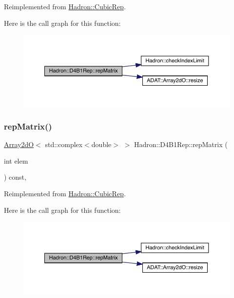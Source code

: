 Reimplemented from \mbox{\hyperlink{structHadron_1_1CubicRep_ac5d7e9e6f4ab1158b5fce3e4ad9e8005}{Hadron\+::\+Cubic\+Rep}}.

Here is the call graph for this function\+:
\nopagebreak
\begin{figure}[H]
\begin{center}
\leavevmode
\includegraphics[width=350pt]{d6/d99/structHadron_1_1D4B1Rep_aaee6044952bae4a4d852115d4e1add07_cgraph}
\end{center}
\end{figure}
\mbox{\label{structHadron_1_1D4B1Rep_aaee6044952bae4a4d852115d4e1add07}} 
\subsubsection{\texorpdfstring{repMatrix()}{repMatrix()}\hspace{0.1cm}{\footnotesize\ttfamily [3/3]}}
{\footnotesize\ttfamily \mbox{\hyperlink{classADAT_1_1Array2dO}{Array2dO}}$<$ std\+::complex$<$double$>$ $>$ Hadron\+::\+D4\+B1\+Rep\+::rep\+Matrix (\begin{DoxyParamCaption}\item[{int}]{elem }\end{DoxyParamCaption}) const\hspace{0.3cm}{\ttfamily [inline]}, {\ttfamily [virtual]}}



Reimplemented from \mbox{\hyperlink{structHadron_1_1CubicRep_ac5d7e9e6f4ab1158b5fce3e4ad9e8005}{Hadron\+::\+Cubic\+Rep}}.

Here is the call graph for this function\+:
\nopagebreak
\begin{figure}[H]
\begin{center}
\leavevmode
\includegraphics[width=350pt]{d6/d99/structHadron_1_1D4B1Rep_aaee6044952bae4a4d852115d4e1add07_cgraph}
\end{center}
\end{figure}


